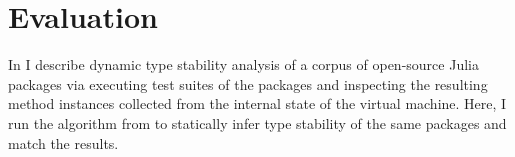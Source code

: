 \section{Evaluation}%
\label{sec:approx:eval}

In  I describe dynamic type stability analysis of a
corpus of open-source Julia packages via executing test suites of the packages and
inspecting the resulting method instances collected from the internal state of
the virtual machine. Here, I run the algorithm from  to
statically infer type stability of the same packages and match the
results.

